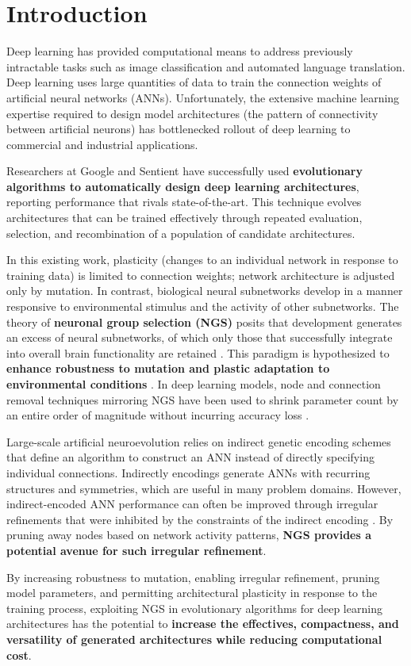 \section{Introduction}

Deep learning has provided computational means to address previously intractable tasks such as image classification and automated language translation.
Deep learning uses large quantities of data to train the connection weights of artificial neural networks (ANNs).
Unfortunately, the extensive machine learning expertise required to design model architectures (the pattern of connectivity between artificial neurons) has bottlenecked rollout of deep learning to commercial and industrial applications.

Researchers at Google \cite{real2017large} and Sentient \cite{miikkulainen2017evolving} have successfully used \textbf{evolutionary algorithms to automatically design deep learning architectures}, reporting performance that rivals state-of-the-art.
This technique evolves architectures that can be trained effectively through repeated evaluation, selection, and recombination of a population of candidate architectures.

In this existing work, plasticity (changes to an individual network in response to training data) is limited to connection weights;
network architecture is adjusted only by mutation.
In contrast, biological neural subnetworks develop in a manner responsive to environmental stimulus and the activity of other subnetworks.
The theory of \textbf{neuronal group selection (NGS)} posits that development generates an excess of neural subnetworks, of which only those that successfully integrate into overall brain functionality are retained \cite{sanes2011development}.
This paradigm is hypothesized to \textbf{enhance robustness to mutation and plastic adaptation to environmental conditions} \cite{downing2015intelligence}.
In deep learning models, node and connection removal techniques mirroring NGS have been used to shrink parameter count by an entire order of magnitude without incurring accuracy loss \cite{song2015learning}.

Large-scale artificial neuroevolution relies on indirect genetic encoding schemes that define an algorithm to construct an ANN instead of directly specifying individual connections.
Indirectly encodings generate ANNs with recurring structures and symmetries, which are useful in many problem domains.
However, indirect-encoded ANN performance can often be improved through irregular refinements that were inhibited by the constraints of the indirect encoding \cite{clune2011performance}.
By pruning away nodes based on network activity patterns, \textbf{NGS provides a potential avenue for such irregular refinement}.

By increasing robustness to mutation, enabling irregular refinement, pruning model parameters, and permitting architectural plasticity in response to the training process, exploiting NGS in evolutionary algorithms for deep learning architectures has the potential to \textbf{increase the effectives, compactness, and versatility of generated architectures while reducing computational cost}.
